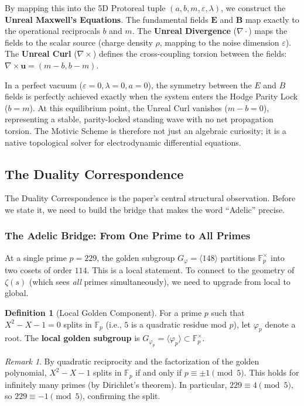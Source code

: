 \documentclass[12pt,oneside]{article}
\theoremstyle{principia}
\theoremstyle{definition}
\newtheorem{definition}[theorem]{Definition}
\theoremstyle{remark}
\newtheorem{remark}[theorem]{Remark}
\providecommand{\FF}{\mathbb{F}}
\providecommand{\vp}{\varphi}
\begin{document}
By mapping this into the 5D Protoreal tuple $(a, b, m, \varepsilon, \lambda)$, we construct the \textbf{Unreal Maxwell's Equations}. The fundamental fields $\mathbf{E}$ and $\mathbf{B}$ map exactly to the operational reciprocals $b$ and $m$. The \textbf{Unreal Divergence} ($\nabla \cdot$) maps the fields to the scalar source (charge density $\rho$, mapping to the noise dimension $\varepsilon$). The \textbf{Unreal Curl} ($\nabla \times$) defines the cross-coupling torsion between the fields: $\nabla \times \mathbf{u} = (m - b, b - m)$.

In a perfect vacuum ($\varepsilon = 0, \lambda = 0, a = 0$), the symmetry between the $E$ and $B$ fields is perfectly achieved exactly when the system enters the Hodge Parity Lock ($b = m$). At this equilibrium point, the Unreal Curl vanishes ($m - b = 0$), representing a stable, parity-locked standing wave with no net propagation torsion. The Motivic Scheme is therefore not just an algebraic curiosity; it is a native topological solver for electrodynamic differential equations.

\subsection{The Duality Correspondence}

The Duality Correspondence is the paper's central structural observation. Before we state it, we need to build the bridge that makes the word ``Adelic'' precise.

\subsubsection*{The Adelic Bridge: From One Prime to All Primes}

At a single prime $p = 229$, the golden subgroup $G_\vp = \langle 148 \rangle$ partitions $\FF_p^\times$ into two cosets of order $114$. This is a local statement. To connect to the geometry of $\zeta(s)$ (which sees \emph{all} primes simultaneously), we need to upgrade from local to global.

\begin{definition}[Local Golden Component]\label{def:local-golden}
For a prime $p$ such that $X^2 - X - 1 = 0$ splits in $\FF_p$ (i.e., $5$ is a quadratic residue mod $p$), let $\vp_p$ denote a root. The \textbf{local golden subgroup} is $G_{\vp_p} = \langle \vp_p \rangle \subset \FF_p^\times$.
\end{definition}

\begin{remark}
By quadratic reciprocity and the factorization of the golden polynomial, $X^2 - X - 1$ splits in $\FF_p$ if and only if $p \equiv \pm 1 \pmod{5}$. This holds for infinitely many primes (by Dirichlet's theorem). In particular, $229 \equiv 4 \pmod{5}$, so $229 \equiv -1 \pmod{5}$, confirming the split.
\end{remark}
\end{document}

